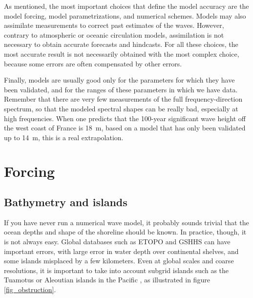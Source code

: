 As mentioned, the most important choices that define the model accuracy are the model forcing, model parametrizations, and numerical schemes. 
 Models may also assimilate measurements to correct past estimates of the waves. However, contrary to atmospheric or oceanic circulation models, 
 assimilation is not necessary to obtain accurate forecasts and hindcasts. 
For all these choices, the most accurate result is not necessarily obtained with the most complex choice, because some errors are often 
compensated by other errors. 

Finally, models are usually good only for the parameters for which they have been validated, and for the ranges of these parameters in which we have data. 
Remember that there are very few measurements of the full frequency-direction 
spectrum, so that the modeled spectral shapes can be really bad, especially at high frequencies. When one predicts that the 100-year significant wave height 
off the west coast of France is 18~m, based on a model that has only been validated up to 14~m, this is a real extrapolation. 


\section{Forcing}
\subsection{Bathymetry and islands}
If you have never run a numerical wave model, it probably sounds trivial that the ocean depths and shape of the shoreline should be known. In practice, 
though, it is not always easy. Global databases such as ETOPO \citep{Sloss1993} and GSHHS \citep{Wessel&Smith1996} can have important errors, with large 
error in water depth over continental shelves, and some islands
misplaced by a few kilometers. Even at global scales and coarse resolutions, it is important to take into account subgrid islands such as the Tuamotus or Aleoutian 
islands in the Pacific \citep{Tolman2003}, as illustrated in figure \ref{fig_obstruction}.

